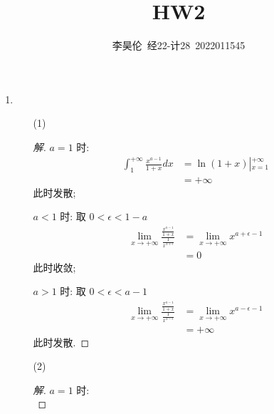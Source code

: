 \documentclass{article}
\title{HW2}
\author{李昊伦\ 经22-计28\ 2022011545}
\begin{document}
\maketitle
\begin{enumerate}
    \item \begin{enumerate}
        \item[(1)] \begin{proof}[解]
            $a=1$ 时: 
            \begin{equation}
                \begin{aligned}
                    \int_{1}^{+\infty}\frac{x^{a-1}}{1+x}dx
                    &=\ln(1+x)\left|_{x=1}^{+\infty}\right. \\
                    &=+\infty
                \end{aligned}
                \nonumber
            \end{equation}
            此时发散; \par
            $a<1$ 时: 取 $0<\epsilon<1-a$
            \begin{equation}
                \begin{aligned}
                    \lim_{x\rightarrow+\infty}\frac{\frac{x^{a-1}}{1+x}}{\frac{1}{x^{1+\epsilon}}}
                    &=\lim_{x\rightarrow+\infty}x^{a+\epsilon-1} \\
                    &=0
                \end{aligned}
                \nonumber
            \end{equation}
            此时收敛; \par
            $a>1$ 时: 取 $0<\epsilon<a-1$
            \begin{equation}
                \begin{aligned}
                    \lim_{x\rightarrow+\infty}\frac{\frac{x^{a-1}}{1+x}}{\frac{1}{x^{1-\epsilon}}}
                    &=\lim_{x\rightarrow+\infty}x^{a-\epsilon-1} \\
                    &=+\infty
                \end{aligned}
                \nonumber
            \end{equation}
            此时发散. \par
        \end{proof}
        \item[(2)] \begin{proof}[解]
            $a=1$ 时: 
            \begin{equation}

\end{equation}
\end{proof}
\end{enumerate}
\end{enumerate}
\end{document}
